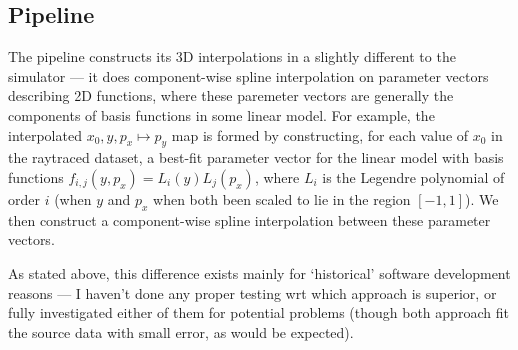 
\subsection{Pipeline}

The pipeline constructs its 3D interpolations in a slightly
different to the simulator --- it does component-wise spline interpolation
on parameter vectors describing 2D functions, where these paremeter vectors
are generally the components of basis functions in some linear model.
For example, the interpolated $x_0, y, p_x \mapsto p_y$ map is formed by
constructing, for each value of $x_0$ in the raytraced dataset, a best-fit
parameter vector for the linear model with basis functions $f_{i,j}(y, p_x) = L_i (y) L_j (p_x)$, where $L_i$ is the Legendre polynomial of order $i$ (when $y$
and $p_x$ when both been scaled to lie in the region $[-1,1]$). We then construct
a component-wise spline interpolation between these parameter vectors.

As stated above, this difference exists mainly for `historical' software development
reasons --- I haven't done any proper testing wrt which approach is superior, or
fully investigated either of them for potential problems (though both approach
fit the source data with small error, as would be expected).
